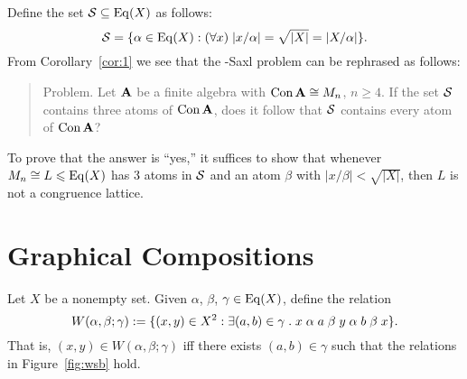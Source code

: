 Define the set $\mathcal{S}\subseteq \operatorname{Eq}(X)$ as follows:
\[
\mathcal{S} = \{ \alpha \in \operatorname{Eq}(X) : (\forall x) \; |x/\alpha|  
= \sqrt{|X|} = |X/\alpha|\}.
\]
From Corollary~\ref{cor:1} we see that the \Palfy-Saxl problem can be rephrased
as follows:

\medskip

\begin{quote}
  {\sc Problem.} Let $\mathbf{A}$ be a finite algebra with $\operatorname{Con} \mathbf{A} \cong M_n$, $n\geq
  4$. %
  If the set $\mathcal{S}$ contains three atoms of
  $\operatorname{Con} \mathbf{A}$,
  does it follow that $\mathcal{S}$ contains every atom of 
  $\operatorname{Con} \mathbf{A}$?
\end{quote}

\medskip


\noindent To prove that the answer is ``yes,'' it suffices to show that 
whenever $M_n \cong L \leqslant \operatorname{Eq}(X)$ has 3 atoms in $\mathcal{S}$ and
an atom $\beta$ with $|x/\beta| < \sqrt{|X|}$, then $L$ is not a
congruence lattice.  


\section{Graphical Compositions}
Let $X$ be a nonempty set. Given $\alpha$, $\beta$, $\gamma \in \operatorname{Eq}(X)$,
define the relation 
\[
W(\alpha, \beta; \gamma) := \{(x,y) \in X^2 : \exists (a, b) \in \gamma
\; . \; x \mathrel{\alpha} a \mathrel{\beta} y \mathrel{\alpha} b \mathrel{\beta} x\}.
\]
That is, $(x,y) \in W(\alpha, \beta; \gamma)$ iff there exists $(a,b)\in \gamma$
such that the relations in Figure~\ref{fig:wsb} hold.

\newcommand\dotsize{1pt}

